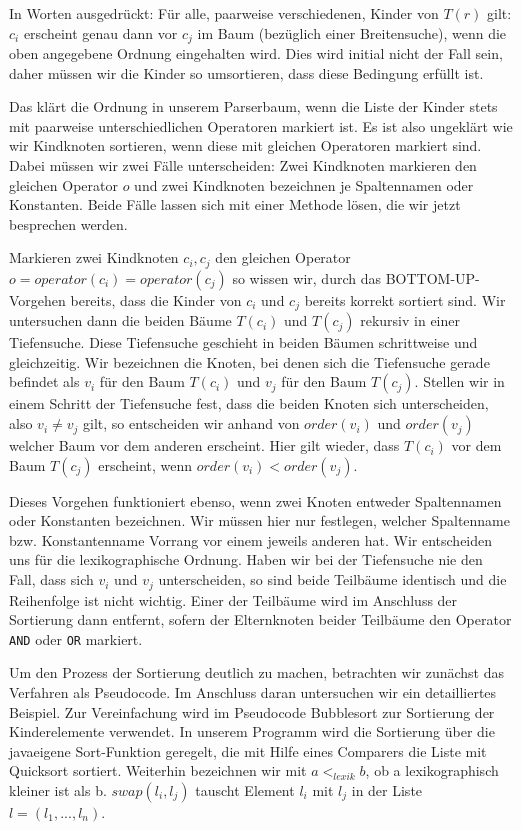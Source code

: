 In Worten ausgedrückt: Für alle, paarweise verschiedenen, Kinder von $T(r)$ gilt: $c_i$ erscheint genau dann vor $c_j$ im Baum (bezüglich einer Breitensuche), wenn die oben angegebene Ordnung eingehalten wird. Dies wird initial nicht der Fall sein, daher müssen wir die Kinder so umsortieren, dass diese Bedingung erfüllt ist. 

Das klärt die Ordnung in unserem Parserbaum, wenn die Liste der Kinder stets mit paarweise unterschiedlichen Operatoren markiert ist. Es ist also ungeklärt wie wir Kindknoten sortieren, wenn diese mit gleichen Operatoren markiert sind. Dabei müssen wir zwei Fälle unterscheiden: Zwei Kindknoten markieren den gleichen Operator $o$ und zwei Kindknoten bezeichnen je Spaltennamen oder Konstanten. Beide Fälle lassen sich mit einer Methode lösen, die wir jetzt besprechen werden.

Markieren zwei Kindknoten $c_i,c_j$ den gleichen Operator $o = operator(c_i) = operator(c_j)$ so wissen wir, durch das BOTTOM-UP-Vorgehen bereits, dass die Kinder von $c_i$ und $c_j$ bereits korrekt sortiert sind. Wir untersuchen dann die beiden Bäume $T(c_i)$ und $T(c_j)$ rekursiv in einer Tiefensuche. Diese Tiefensuche geschieht in beiden Bäumen schrittweise und gleichzeitig. Wir bezeichnen die Knoten, bei denen sich die Tiefensuche gerade befindet als $v_i$ für den Baum $T(c_i)$ und $v_j$ für den Baum $T(c_j)$. Stellen wir in einem Schritt der Tiefensuche fest, dass die beiden Knoten sich unterscheiden, also $v_i \neq v_j$ gilt, so entscheiden wir anhand von $order(v_i)$ und $order(v_j)$ welcher Baum vor dem anderen erscheint. Hier gilt wieder, dass $T(c_i)$ vor dem Baum $T(c_j)$ erscheint, wenn $order(v_i) < order(v_j)$. 

Dieses Vorgehen funktioniert ebenso, wenn zwei Knoten entweder Spaltennamen oder Konstanten bezeichnen. Wir müssen hier nur festlegen, welcher Spaltenname bzw. Konstantenname Vorrang vor einem jeweils anderen hat. Wir entscheiden uns  für die lexikographische Ordnung. Haben wir bei der Tiefensuche nie den Fall, dass sich $v_i$ und $v_j$ unterscheiden, so sind beide Teilbäume identisch und die Reihenfolge ist nicht wichtig. Einer der Teilbäume wird im Anschluss der Sortierung dann entfernt, sofern der Elternknoten beider Teilbäume den Operator \verb|AND| oder \verb|OR| markiert.

Um den Prozess der Sortierung deutlich zu machen, betrachten wir zunächst das Verfahren als Pseudocode. Im Anschluss daran untersuchen wir ein detailliertes Beispiel. Zur Vereinfachung wird im Pseudocode Bubblesort zur Sortierung der Kinderelemente verwendet. In unserem Programm wird die Sortierung über die javaeigene Sort-Funktion geregelt, die mit Hilfe eines Comparers die Liste mit Quicksort sortiert. Weiterhin bezeichnen wir mit $a <_{lexik} b$, ob a lexikographisch kleiner ist als b. $swap(l_i,l_j)$ tauscht Element $l_i$ mit $l_j$ in der Liste $l=(l_1,...,l_n)$. 


